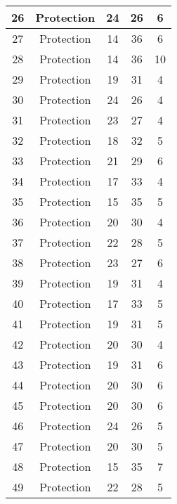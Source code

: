 \documentclass[results.tex]{subfiles}
\begin{document}
\begin{center}
\begin{tabular}{| c || c | c | c | c |}
    \hline
    26 & Protection & 24 & 26 & 6 \\ 
    \hline
    27 & Protection & 14 & 36 & 6 \\ 
    \hline
    28 & Protection & 14 & 36 & 10 \\ 
    \hline
    29 & Protection & 19 & 31 & 4 \\ 
    \hline
    30 & Protection & 24 & 26 & 4 \\ 
    \hline
    31 & Protection & 23 & 27 & 4 \\ 
    \hline
    32 & Protection & 18 & 32 & 5 \\ 
    \hline
    33 & Protection & 21 & 29 & 6 \\ 
    \hline
    34 & Protection & 17 & 33 & 4 \\ 
    \hline
    35 & Protection & 15 & 35 & 5 \\ 
    \hline
    36 & Protection & 20 & 30 & 4 \\ 
    \hline
    37 & Protection & 22 & 28 & 5 \\ 
    \hline
    38 & Protection & 23 & 27 & 6 \\ 
    \hline
    39 & Protection & 19 & 31 & 4 \\ 
    \hline
    40 & Protection & 17 & 33 & 5 \\ 
    \hline
    41 & Protection & 19 & 31 & 5 \\ 
    \hline
    42 & Protection & 20 & 30 & 4 \\ 
    \hline
    43 & Protection & 19 & 31 & 6 \\ 
    \hline
    44 & Protection & 20 & 30 & 6 \\ 
    \hline
    45 & Protection & 20 & 30 & 6 \\ 
    \hline
    46 & Protection & 24 & 26 & 5 \\ 
    \hline
    47 & Protection & 20 & 30 & 5 \\ 
    \hline
    48 & Protection & 15 & 35 & 7 \\ 
    \hline
    49 & Protection & 22 & 28 & 5 \\ 
    \hline   \end{tabular}
\end{center}
\end{document}
